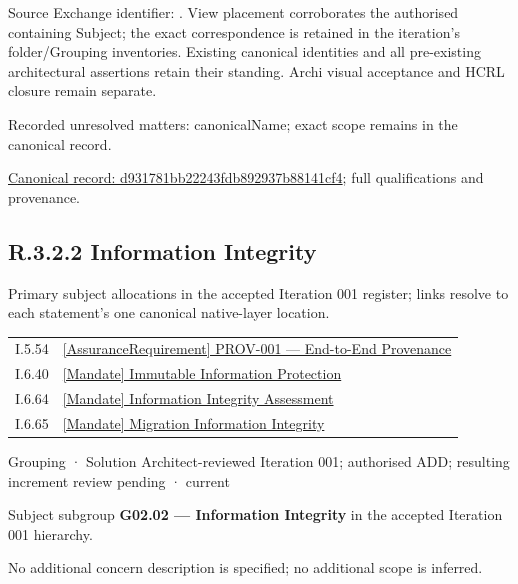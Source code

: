Source Exchange identifier: \texttt{}. View placement corroborates
the authorised containing Subject; the exact correspondence is retained in the
iteration's folder/Grouping inventories. Existing canonical identities and all
pre-existing architectural assertions retain their standing. Archi visual
acceptance and HCRL closure remain separate.


{\small Recorded unresolved matters: canonicalName; exact scope remains in the canonical record.}\par
{\footnotesize \href{../../../../continuum/grouping/d931781bb22243fdb892937b88141cf4.md}{Canonical record: d931781bb22243fdb892937b88141cf4}; full qualifications and provenance.}\par
\subsection*{R.3.2.2 Information Integrity}
\label{navigation:R.3.2.2}

Primary subject allocations in the accepted Iteration 001 register; links resolve to each statement’s one canonical native-layer location.\par
\begin{longtable}{p{.22\linewidth}p{.73\linewidth}}
I.5.54 & \hyperref[element:3e45e60affb44bf384d54de26d3add6a]{[AssuranceRequirement] PROV-001 — End-to-End Provenance} \\
I.6.40 & \hyperref[element:4a25d9c8aaa9418fbddb5bff7302c46d]{[Mandate] Immutable Information Protection} \\
I.6.64 & \hyperref[element:6316761bfd414032a8d889c7ba34131d]{[Mandate] Information Integrity Assessment} \\
I.6.65 & \hyperref[element:22583ccb89dc4cf683c710760bc4b1f2]{[Mandate] Migration Information Integrity} \\
\end{longtable}
\label{element:eb1b0526b898448688a322cce7ea6e74}
{\small Grouping · Solution Architect-reviewed Iteration 001; authorised ADD; resulting increment review pending · current}\par

Subject subgroup \textbf{G02.02 — Information Integrity} in the accepted Iteration 001 hierarchy.



No additional concern description is specified; no additional scope is inferred.



